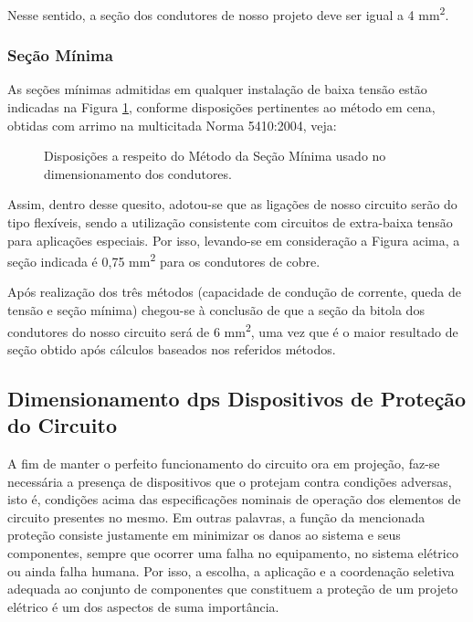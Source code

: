 Nesse sentido, a seção dos condutores de nosso projeto deve ser igual a 4 mm\textsuperscript{2}.

\subsubsection{Seção Mínima}

As seções mínimas admitidas em qualquer instalação de baixa tensão estão indicadas na Figura \ref{secao-minima-condutores}, conforme disposições pertinentes ao método em cena, obtidas com arrimo na multicitada Norma 5410:2004, veja:

\begin{figure}[h]
	\centering
	\caption{ Disposições a respeito do Método da Seção Mínima usado no dimensionamento dos condutores.}
	\label{secao-minima-condutores}
\end{figure}

Assim, dentro desse quesito, adotou-se que as ligações de nosso circuito serão do tipo flexíveis, sendo a utilização consistente com circuitos de extra-baixa tensão para aplicações especiais. Por isso, levando-se em consideração a Figura acima, a seção indicada é 0,75 mm\textsuperscript{2} para os condutores de cobre.
 	
 	Após realização dos três métodos (capacidade de condução de corrente, queda de tensão e seção mínima) chegou-se à conclusão de que a seção da bitola dos condutores do nosso circuito será de 6 mm\textsuperscript{2}, uma vez que é o maior resultado de seção obtido após cálculos baseados nos referidos métodos.
 	
\subsection{Dimensionamento dps Dispositivos de Proteção do Circuito}

A fim de manter o perfeito funcionamento do circuito ora em projeção, faz-se necessária a presença de dispositivos que o protejam contra condições adversas, isto é, condições acima das especificações nominais de operação dos elementos de circuito presentes no mesmo.
Em outras palavras, a função da mencionada proteção consiste justamente em minimizar os danos ao sistema e seus componentes, sempre que ocorrer uma falha no equipamento, no sistema elétrico ou ainda falha humana. Por isso, a escolha, a aplicação e a coordenação seletiva adequada ao conjunto de componentes que constituem a proteção de um projeto elétrico é um dos aspectos de suma importância.

